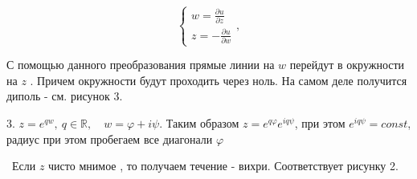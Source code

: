 $$ \begin{cases}
	w  = \frac{\partial u}{\partial z}\\
	z = -\frac{\partial u}{\partial w} 
\end{cases},$$

С помощью данного преобразования прямые линии на $w$ перейдут в окружности на $z$ . Причем окружности будут проходить через ноль. На самом деле получится диполь - см. рисунок 3.  

3. $z = e^{q w}, \ q \in \mathbb{R} , \quad w = \varphi + i \psi$. Таким образом $z = e^{q \varphi} e^{i q \psi}$, при этом $e^{i q \psi} = const$, радиус при этом пробегаем все диагонали $\varphi$

 Если $z$ чисто мнимое , то получаем течение - вихри. Соответствует рисунку 2.
